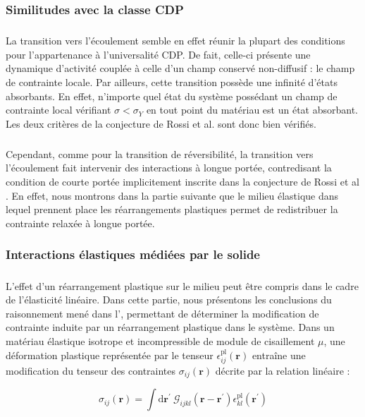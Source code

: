 \subsubsection{Similitudes avec la classe CDP}

\subparagraph{}La transition vers l'écoulement semble en effet réunir la plupart des conditions pour l'appartenance à l'universalité CDP. De fait, celle-ci présente une dynamique d'activité couplée à celle d'un champ conservé non-diffusif : le champ de contrainte locale. Par ailleurs, cette transition possède une infinité d'états absorbants. En effet, n'importe quel état du système possédant un champ de contrainte local vérifiant $\sigma < \sigma_Y$ en tout point du matériau est un état absorbant. Les deux critères de la conjecture de Rossi et al. \cite{rossi_universality_2000} sont donc bien vérifiés.

\subparagraph{}Cependant, comme pour la transition de réversibilité, la transition vers l'écoulement fait intervenir des interactions à longue portée, contredisant la condition de courte portée implicitement inscrite dans la conjecture de Rossi et al \cite{rossi_universality_2000}. En effet, nous montrons dans la partie suivante que le milieu élastique dans lequel prennent place les réarrangements plastiques permet de redistribuer la contrainte relaxée à longue portée.

\subsubsection{Interactions élastiques médiées par le solide}

\label{sec:ref_interac_elast}

\subparagraph{}L'effet d'un réarrangement plastique sur le milieu peut être compris dans le cadre de l'élasticité linéaire. Dans cette partie, nous présentons les conclusions du raisonnement mené dans l', permettant de déterminer la modification de contrainte induite par un réarrangement plastique dans le système. Dans un matériau élastique isotrope et incompressible de module de cisaillement $\mu$, une déformation plastique représentée par le tenseur $\epsilon_{ij}^\text{pl}(\mathbf{r})$ entraîne une modification du tenseur des contraintes $\sigma_{ij}(\mathbf{r})$ décrite par la relation linéaire :

\begin{equation}
	\sigma_{ij}(\mathbf{r}) = \int\mathrm{d}\mathbf{r}^\prime~ \mathcal{G}_{ijkl}(\mathbf{r}-\mathbf{r}^\prime)\epsilon^\text{pl}_{kl}(\mathbf{r}^\prime)
\end{equation}


